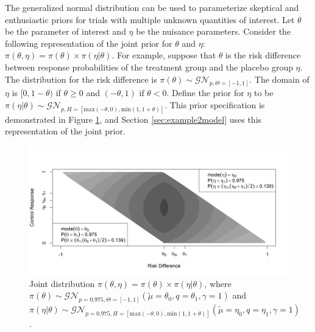 \documentclass[12pt]{article}
\begin{document}

The generalized normal distribution can be used to parameterize skeptical and enthusiastic priors for trials with multiple unknown quantities of interest. Let $\theta$ be the parameter of interest and $\eta$ be the nuisance parameters. Consider the following representation of the joint prior for $\theta$ and $\eta$: $\pi(\theta,\eta)=\pi(\theta)\times\pi(\eta|\theta)$. For example, suppose that $\theta$ is the risk difference between response probabilities of the treatment group and the placebo group $\eta$. The distribution for the risk difference is $
\pi(\theta)\sim\mathcal{GN}_{p,\Theta=[-1,1]}$. The domain of $\eta$ is $[0,1-\theta)$ if $\theta\geq 0$ and $(-\theta,1)$ if $\theta < 0$. Define the prior for $\eta$ to be $\pi(\eta|\theta)\sim \mathcal{GN}_{p,H=[\text{max}(-\theta,0),\text{min}(1,1+\theta)]}$. This prior specification is demonstrated in Figure \ref{fig:figure5}, and Section \ref{sec:example2model} uses this representation of the joint prior.



\begin{figure}\begin{center}
\includegraphics[width=6in]{./FIGURES/figure5a.png}
\caption{Joint distribution $\pi(\theta,\eta)=\pi(\theta)\times\pi(\eta|\theta)$, where $
\pi(\theta)\sim\mathcal{GN}_{p=0.975,\Theta=[-1,1]}(\tilde{\mu}=\theta_0,q=\theta_1,\gamma=1)$ and $\pi(\eta|\theta)\sim \mathcal{GN}_{p=0.975,H=[\text{max}(-\theta,0),\text{min}(1,1+\theta)]}(\tilde{\mu}=\eta_0,q=\eta_1,\gamma=1)$.}
\label{fig:figure5}
 \end{center}\end{figure}
\end{document}
